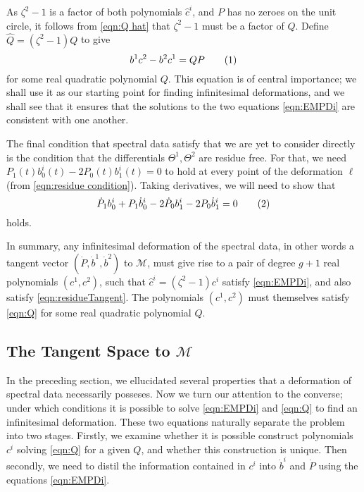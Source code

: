 As $ζ^2-1$ is a factor of both polynomials $\hat{c}^i$, and $P$ has no zeroes on the unit circle, it follows from \eqref{eqn:Q hat} that $ζ^2-1$ must be a factor of $\hat{Q}$. Define $\hat Q = (\zeta^2-1)Q$ to give
\[
b^1 c^2 - b^2 c^1 = Q P
\labelthis{eqn:Q}
\]
for some real quadratic polynomial $Q$. This equation is of central importance; we shall use it as our starting point for finding infinitesimal deformations, and we shall see that it ensures that the solutions to the two equations \eqref{eqn:EMPDi} are consistent with one another.

The final condition that spectral data satisfy that we are yet to consider directly is the condition that the differentials $Θ^1,Θ^2$ are residue free. For that, we need $P_1(t)b^i_0(t) - 2P_0(t)b^i_1(t) = 0$ to hold at every point of the deformation $\ell$ (from \eqref{eqn:residue condition}). Taking derivatives, we will need to show that
\[
\dot{P}_1 b^i_0 + P_1 \dot{b}^i_0 - 2 \dot{P}_0 b^i_1 - 2 P_0 \dot{b}^i_1 = 0 \labelthis{eqn:residueTangent}
\]
holds.

In summary, any infinitesimal deformation of the spectral data, in other words a tangent vector $(\dot P, \dot b^1, \dot b^2)$ to $\mathcal{M}$, must give rise to a pair of degree $g+1$ real polynomials $(c^1,c^2)$, such that $\hat{c}^i = (ζ^2-1)c^i$ satisfy \eqref{eqn:EMPDi}, and also satisfy \eqref{eqn:residueTangent}. The polynomials $(c^1,c^2)$ must themselves satisfy \eqref{eqn:Q} for some real quadratic polynomial $Q$.













\subsection{The Tangent Space to $\mathcal{M}$}
\label{sub:tangent space}

In the preceding section, we ellucidated several properties that a deformation of spectral data necessarily posseses. Now we turn our attention to the converse; under which conditions it is possible to solve \eqref{eqn:EMPDi} and \eqref{eqn:Q} to find an infinitesimal deformation. These two equations naturally separate the problem into two stages. Firstly, we examine whether it is possible construct polynomials $c^i$ solving \eqref{eqn:Q} for a given $Q$, and whether this construction is unique. Then secondly, we need to distil the information contained in $c^i$ into $\dot{b}^i$ and $\dot{P}$ using the equations \eqref{eqn:EMPDi}.

